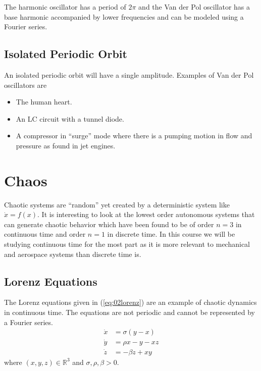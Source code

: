 The harmonic oscillator has a period of $2\pi$ and the Van der Pol oscillator has a base harmonic accompanied by lower frequencies and can be modeled using a Fourier series.

\subsection{Isolated Periodic Orbit}
An isolated periodic orbit will have a single amplitude.
Examples of Van der Pol oscillators are
\begin{itemize}
\item The human heart.
\item An LC circuit with a tunnel diode.
\item A compressor in ``surge'' mode where there is a pumping motion in flow and pressure as found in jet engines.
\end{itemize}

\section{Chaos}
Chaotic systems are ``random'' yet created by a deterministic system like $\dot{x}=f(x)$.
It is interesting to look at the lowest order autonomous systems that can generate chaotic behavior which have been found to be of order $n=3$ in continuous time and order $n=1$ in discrete time.
In this course we will be studying continuous time for the most part as it is more relevant to mechanical and aerospace systems than discrete time is.

\subsection{Lorenz Equations}
The Lorenz equations given in (\ref{eq:02lorenz}) are an example of chaotic dynamics in continuous time.
The equations are not periodic and cannot be represented by a Fourier series.
\begin{align}
\label{eq:02lorenz}
\dot{x} &= \sigma(y - x) \nonumber \\
\dot{y} &= \rho x - y - xz \\
\dot{z} &= -\beta z + xy \nonumber
\end{align}
where $(x,y,z)\in\mathbb{R}^3$ and $\sigma, \rho, \beta > 0$.

